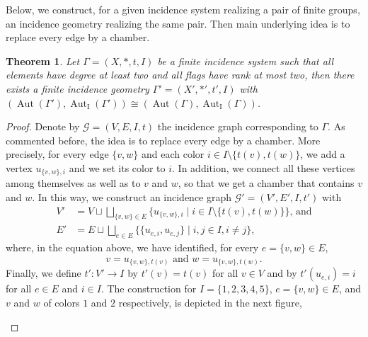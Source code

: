 \documentclass{amsart}
\newtheorem{theorem}{Theorem}[section]
\theoremstyle{definition}
\theoremstyle{remark}
\newcommand{\Aut}{\operatorname{Aut}}
\newcommand{\AutI}{\Aut_{\text{I}}}
\begin{document}
Below, we construct, for a given incidence system realizing a pair of finite groups, an incidence geometry realizing the same pair. Then main underlying idea is to replace every edge by a chamber.  


\begin{theorem}\label{thm:from incidence system to incidence geometry}
Let $\Gamma=(X,\ast,t,I)$ be a finite incidence system such that all elements have degree at least two and all flags have rank at most two, then there exists a finite incidence geometry $\Gamma'=(X',\ast',t', I)$ with $(\Aut(\Gamma'),\AutI(\Gamma'))\cong (\Aut(\Gamma),\AutI(\Gamma))$.
\end{theorem}

\begin{proof}
Denote by $\mathcal{G}=(V,E,I,t)$  the incidence graph corresponding to $\Gamma$. As commented before, the idea is to replace every edge by a chamber. More precisely, for every edge $\{v,w\}$ and each color $i\in I\setminus\{t(v),t(w)\}$, we add a vertex $u_{\{v,w\},i}$ and we set its color to $i$. In addition, we connect all these vertices among themselves as well as to $v$ and $w$, so that we get a chamber that contains $v$ and $w$. In this way, we construct an incidence graph $\mathcal{G'}=(V',E',I,t')$  with 
\begin{align*}
  V'&=V\sqcup\bigsqcup_{\{v,w\}\in E}\{u_{\{v,w\},i}\mid i\in I\setminus\{t(v),t(w)\}\}\text{, and}\\
  E'&=E\sqcup \bigsqcup_{e\in E}\{\{u_{e,i},u_{e,j}\}\mid i,j\in I, i\neq j\},
\end{align*}
where, in the equation above, we have identified, for every $e=\{v,w\}\in E$,
\begin{equation}\label{equ:nice_identification_of_vertices}
v=u_{\{v,w\},t(v)}\text{ and }w=u_{\{v,w\},t(w)}.
\end{equation} 
Finally, we define  $t'\colon V'\to I$ by $t'(v)=t(v)$ for all $v\in V$ and by $t'(u_{e,i})=i$ for all $e\in E$ and $i\in I$. The construction for $I=\{1,2,3,4,5\}$, $e=\{v,w\}\in E$, and $v$ and $w$ of colors $1$ and $2$ respectively, is depicted in the next figure,

\begin{center}
\end{center}
\end{proof}
\end{document}

